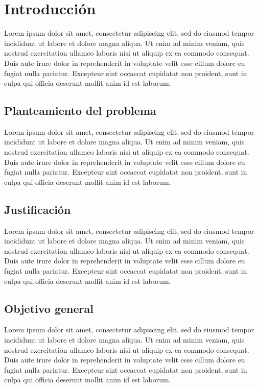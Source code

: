 \newpage

\section{Introducción}
\label{sec:introducción}

Lorem ipsum dolor sit amet, consectetur adipiscing elit, sed do eiusmod tempor incididunt ut labore et dolore magna aliqua. Ut enim ad minim veniam, quis nostrud exercitation ullamco laboris nisi ut aliquip ex ea commodo consequat. Duis aute irure dolor in reprehenderit in voluptate velit esse cillum dolore eu fugiat nulla pariatur. Excepteur sint occaecat cupidatat non proident, sunt in culpa qui officia deserunt mollit anim id est laborum.

\newpage

\subsection{Planteamiento del problema}

Lorem ipsum dolor sit amet, consectetur adipiscing elit, sed do eiusmod tempor incididunt ut labore et dolore magna aliqua. Ut enim ad minim veniam, quis nostrud exercitation ullamco laboris nisi ut aliquip ex ea commodo consequat. Duis aute irure dolor in reprehenderit in voluptate velit esse cillum dolore eu fugiat nulla pariatur. Excepteur sint occaecat cupidatat non proident, sunt in culpa qui officia deserunt mollit anim id est laborum.

\subsection{Justificación}

Lorem ipsum dolor sit amet, consectetur adipiscing elit, sed do eiusmod tempor incididunt ut labore et dolore magna aliqua. Ut enim ad minim veniam, quis nostrud exercitation ullamco laboris nisi ut aliquip ex ea commodo consequat. Duis aute irure dolor in reprehenderit in voluptate velit esse cillum dolore eu fugiat nulla pariatur. Excepteur sint occaecat cupidatat non proident, sunt in culpa qui officia deserunt mollit anim id est laborum.

\subsection{Objetivo general}

Lorem ipsum dolor sit amet, consectetur adipiscing elit, sed do eiusmod tempor incididunt ut labore et dolore magna aliqua. Ut enim ad minim veniam, quis nostrud exercitation ullamco laboris nisi ut aliquip ex ea commodo consequat. Duis aute irure dolor in reprehenderit in voluptate velit esse cillum dolore eu fugiat nulla pariatur. Excepteur sint occaecat cupidatat non proident, sunt in culpa qui officia deserunt mollit anim id est laborum.

